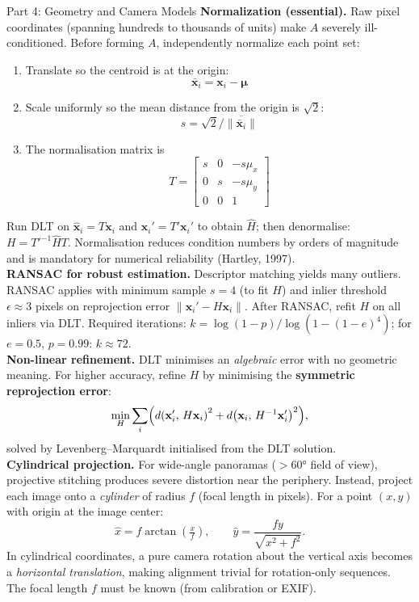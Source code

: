 \documentclass[letterpaper]{article}
\begin{document}
\begin{notes}{Part 4: Geometry and Camera Models}
\textbf{Normalization (essential).} Raw pixel coordinates (spanning hundreds to thousands of units) make $A$ severely ill-conditioned. Before forming $A$, independently normalize each point set:
\begin{enumerate}
    \item Translate so the centroid is at the origin: 
    $$\bar{\mathbf{x}}_i = \mathbf{x}_i - \boldsymbol{\mu}$$
    \item Scale uniformly so the mean distance from the origin is $\sqrt{2}$: 
    $$s = \sqrt{2}/\overline{\|\bar{\mathbf{x}}_i\|}$$
    \item The normalisation matrix is 
    $$T = \begin{bmatrix} s & 0 & -s\mu_x \\ 0 & s & -s\mu_y \\ 0 & 0 & 1 \end{bmatrix}$$
\end{enumerate}
Run DLT on $\hat{\mathbf{x}}_i = T\mathbf{x}_i$ and $\hat{\mathbf{x}}_i' = T'\mathbf{x}_i'$ to obtain $\hat{H}$; then denormalise: $H = T'^{-1}\hat{H}T$. Normalisation reduces condition numbers by orders of magnitude and is mandatory for numerical reliability (Hartley, 1997).\\

\textbf{RANSAC for robust estimation.} Descriptor matching yields many outliers. RANSAC applies with minimum sample $s=4$ (to fit $H$) and inlier threshold $\epsilon \approx 3$ pixels on reprojection error $\|\mathbf{x}_i' - H\mathbf{x}_i\|$. After RANSAC, refit $H$ on all inliers via DLT. Required iterations: $k = \log(1-p)/\log(1-(1-e)^4)$; for $e=0.5$, $p=0.99$: $k\approx72$.\\

\textbf{Non-linear refinement.} DLT minimises an \emph{algebraic} error with no geometric meaning. For higher accuracy, refine $H$ by minimising the \textbf{symmetric reprojection error}:
$$\min_H \sum_i \Bigl(d\!\left(\mathbf{x}_i',\,H\mathbf{x}_i\right)^2 + d\!\left(\mathbf{x}_i,\,H^{-1}\mathbf{x}_i'\right)^2\Bigr),$$
solved by Levenberg--Marquardt initialised from the DLT solution.\\

\textbf{Cylindrical projection.} For wide-angle panoramas ($>\!60°$ field of view), projective stitching produces severe distortion near the periphery. Instead, project each image onto a \emph{cylinder} of radius $f$ (focal length in pixels). For a point $(x,y)$ with origin at the image center:
$$\hat{x} = f\arctan\!\left(\tfrac{x}{f}\right), \qquad \hat{y} = \frac{fy}{\sqrt{x^2+f^2}}.$$
In cylindrical coordinates, a pure camera rotation about the vertical axis becomes a \emph{horizontal translation}, making alignment trivial for rotation-only sequences. The focal length $f$ must be known (from calibration or EXIF).\\


\end{notes}
\end{document}
